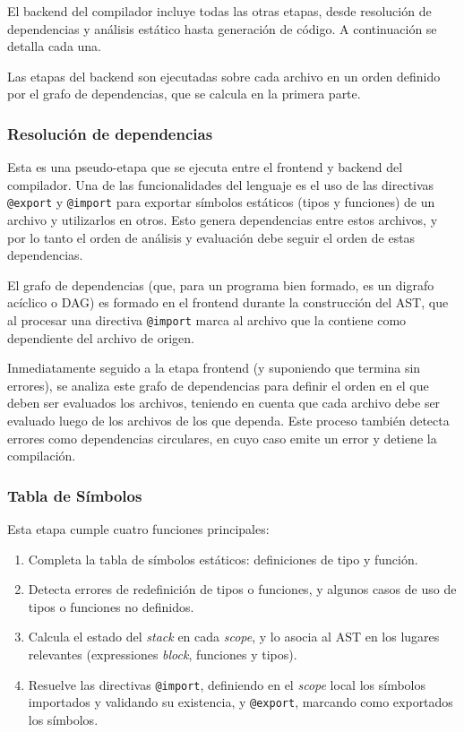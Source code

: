 El backend del compilador incluye todas las otras etapas, desde resolución de dependencias y análisis estático hasta generación de código. A continuación se detalla cada una.

Las etapas del backend son ejecutadas sobre cada archivo en un orden definido por el grafo de dependencias, que se calcula en la primera parte.

\subsubsection{Resolución de dependencias}\label{subsub:dependency_resolution}

Esta es una pseudo-etapa que se ejecuta entre el frontend y backend del compilador. Una de las funcionalidades del lenguaje es el uso de las directivas \texttt{@export} y \texttt{@import} para exportar símbolos estáticos (tipos y funciones) de un archivo y utilizarlos en otros. Esto genera dependencias entre estos archivos, y por lo tanto el orden de análisis y evaluación debe seguir el orden de estas dependencias.

El grafo de dependencias (que, para un programa bien formado, es un digrafo acíclico o DAG) es formado en el frontend durante la construcción del AST, que al procesar una directiva \texttt{@import} marca al archivo que la contiene como dependiente del archivo de origen.

Inmediatamente seguido a la etapa frontend (y suponiendo que termina sin errores), se analiza este grafo de dependencias para definir el orden en el que deben ser evaluados los archivos, teniendo en cuenta que cada archivo debe ser evaluado luego de los archivos de los que dependa. Este proceso también detecta errores como dependencias circulares, en cuyo caso emite un error y detiene la compilación.

\subsubsection{Tabla de Símbolos}

Esta etapa cumple cuatro funciones principales:

\begin{enumerate}
	\item Completa la tabla de símbolos estáticos: definiciones de tipo y función.
	\item Detecta errores de redefinición de tipos o funciones, y algunos casos de uso de tipos o funciones no definidos.
	\item Calcula el estado del \textit{stack} en cada \textit{scope}, y lo asocia al AST en los lugares relevantes (expressiones \textit{block}, funciones y tipos).
	\item Resuelve las directivas \texttt{@import}, definiendo en el \textit{scope} local los símbolos importados y validando su existencia, y \texttt{@export}, marcando como exportados los símbolos.
\end{enumerate}

